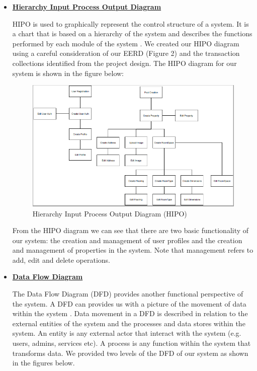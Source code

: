 \documentclass[12pt,a4paper]{report}
\begin{document}
\begin{itemize}
\item \textbf{\underline{Hierarchy Input Process Output Diagram}} \par 
HIPO is used to graphically represent the control structure of a system. It is a chart that is based on a hierarchy of the system and describes the functions performed by each module of the system \cite{CL}. We created our HIPO diagram using a careful consideration of our EERD (Figure 2) and the transaction collections identified from the project design. The HIPO diagram for our system is shown in the figure below:

\begin{figure}[H]
\centering
\includegraphics[scale=1.0]{hipo.png}
\caption{Hierarchy Input Process Output Diagram (HIPO)}
\label{Figure:hipo}
\end{figure}

From the HIPO diagram we can see that there are two basic functionality of our system: the creation and management of user profiles and the creation and management of properties in the system. Note that management refers to add, edit and delete operations.

\item \textbf{\underline{Data Flow Diagram}} \par 
The Data Flow Diagram (DFD) provides another functional perspective of the system. A DFD can provides us with a picture of the movement of data within the system \cite{CL}. Data movement in a DFD is described in relation to the external entities of the system and the processes and data stores within the system. An entity is any external actor that interact with the system (e.g. users, admins, services etc). A process is any function within the system that transforms data. We provided two levels of the DFD of our system as shown in the figures below.


\end{itemize}
\end{document}
